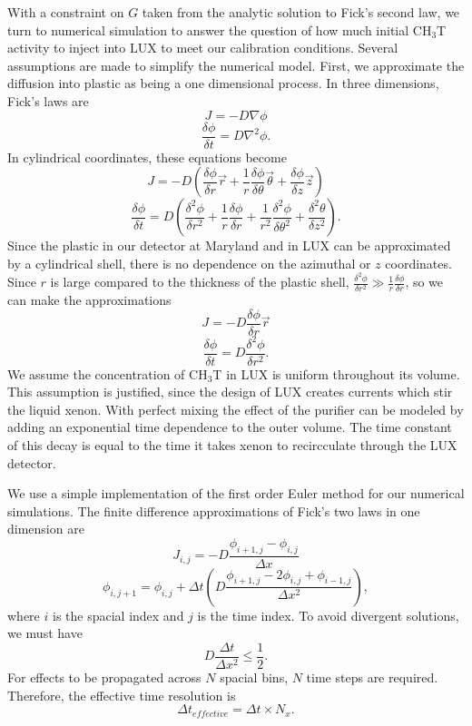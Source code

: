 \documentclass[a4paper,12pt]{article}
\begin{document}
With a constraint on $G$ taken from the analytic solution to Fick's second law, we turn to numerical simulation to answer the question of how much initial CH$_3$T activity to inject into LUX to meet our calibration conditions.  Several assumptions are made to simplify the numerical model.  First, we approximate the diffusion into plastic as being a one dimensional process. In three dimensions, Fick's laws are
\[J=-D\nabla \phi\]
\[\frac{\delta\phi}{\delta t} = D \nabla^2 \phi .\]
In cylindrical coordinates, these equations become
\[J = -D (\frac{\delta \phi}{\delta r} \vec{r} + \frac{1}{r}\frac{\delta \phi}{\delta \theta}\vec{\theta} + \frac{\delta \phi}{\delta z}\vec{z})\]
\[\frac{\delta \phi}{\delta t} = D ( \frac{\delta^2\phi}{\delta r^2} + \frac{1}{r}\frac{\delta \phi}{\delta r} + \frac{1}{r^2}\frac{\delta^2 \phi}{\delta \theta^2} + \frac{\delta^2 \theta}{\delta z^2}).\]
Since the plastic in our detector at Maryland and in LUX can be approximated by a cylindrical shell, there is no dependence on the azimuthal or $z$ coordinates.  Since $r$ is large compared to the thickness of the plastic shell, $\frac{\delta^2 \phi}{\delta r^2} \gg \frac{1}{r} \frac {\delta \phi}{\delta r}$, so we can make the approximations
\[J=-D\frac{\delta \phi}{\delta r}\vec{r}\]
\[\frac{\delta \phi}{\delta t} = D \frac{\delta^2 \phi}{\delta r^2}.\]  We assume the concentration of CH$_3$T in LUX is uniform throughout its volume.  This assumption is justified, since the design of LUX creates currents which stir the liquid xenon.  With perfect mixing the effect of the purifier can be modeled by adding an exponential time dependence to the outer volume.  The time constant of this decay is equal to the time it takes xenon to recircculate through the LUX detector.

We use a simple implementation of the first order Euler method for our numerical simulations.  The finite difference approximations of Fick's two laws in one dimension are 
\[J_{i,j} = -D \frac{\phi_{i+1,j}-\phi_{i,j}}{\Delta x }\]
\[\phi_{i,j+1} = \phi_{i,j} + \Delta t (D \frac{\phi_{i+1,j} - 2 \phi_{i,j} + \phi_{i-1,j}}{\Delta x^2}),\]
where $i$ is the spacial index and $j$ is the time index.  To avoid divergent solutions, we must have
\[D \frac{\Delta t}{\Delta x^2} \leq \frac{1}{2}.\]
For effects to be propagated across $N$ spacial bins, $N$ time steps are required.  Therefore, the effective time resolution is
\[\Delta t_{effective} = \Delta t \times N_x.\]
\end{document}
